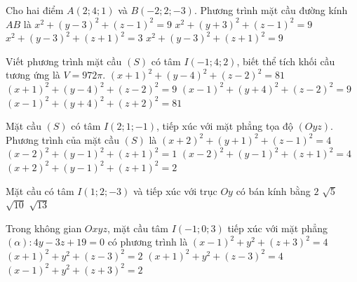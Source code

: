 \begin{ex}%
	Cho hai điểm $A(2; 4; 1)$ và $B(-2; 2; -3)$. Phương trình mặt cầu đường kính $AB$ là
	\choice
	{$x^2+(y-3)^2+(z-1)^2=9$}
	{$x^2+(y+3)^2+(z-1)^2=9$}
	{$x^2+(y-3)^2+(z+1)^2=3$}
	{\True $x^2+(y-3)^2+(z+1)^2=9$}
\end{ex}



\begin{ex}%
	Viết phương trình mặt cầu $(S)$ có tâm $I(-1;4;2)$, biết thể tích khối cầu tương ứng là $V=972\pi$.
	\choice
	{\True $(x+1)^2+(y-4)^2+(z-2)^2=81$}
	{$(x+1)^2+(y-4)^2+(z-2)^2=9$}
	{$(x-1)^2+(y+4)^2+(z-2)^2=9$}
	{$(x-1)^2+(y+4)^2+(z+2)^2=81$}
\end{ex}

\begin{ex}%
	Mặt cầu $(S)$ có tâm $I(2; 1; -1)$, tiếp xúc với mặt phẳng tọa độ $(Oyz)$. Phương trình của mặt cầu $(S)$ là
	\choice
	{$(x+2)^2+(y+1)^2+(z-1)^2=4$}
	{$(x-2)^2+(y-1)^2+(z+1)^2=1$}
	{\True $(x-2)^2+(y-1)^2+(z+1)^2=4$}
	{$(x+2)^2+(y-1)^2+(z+1)^2=2$}
\end{ex}

\begin{ex}%
	Mặt cầu có tâm $I(1; 2; -3)$ và tiếp xúc với trục $Oy$ có bán kính bằng
	\choice
	{$2$}
	{$\sqrt{5}$}
	{\True $\sqrt{10}$}
	{$\sqrt{13}$}
\end{ex}

\begin{ex}
	Trong không gian $Oxyz$, mặt cầu tâm $I(-1;0;3)$ tiếp xúc với mặt phẳng $(\alpha) \colon 4y-3z+19=0$ có phương trình là
	\choice
	{$(x-1)^2+y^2+(z+3)^2=4$}
	{$(x+1)^2+y^2+(z-3)^2=2$}
	{\True $(x+1)^2+y^2+(z-3)^2=4$}
	{$(x-1)^2+y^2+(z+3)^2=2$}
\end{ex}

